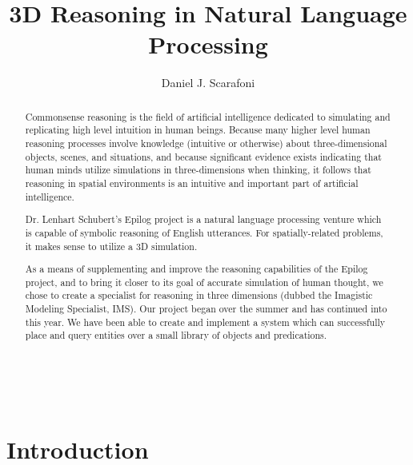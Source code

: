 \documentclass[11pt,leqno]{report}
\newcommand\TDS[0]{IMS\xspace}
\begin{document}
\sloppy
\title{3D Reasoning in Natural Language Processing}
\author{Daniel J. Scarafoni}
\maketitle


\thispagestyle{empty}
\newenvironment{dedication}
{\cleardoublepage \thispagestyle{empty} \vspace*{\stretch{1}}
  \begin{center} \em}
  {\end{center} \vspace*{\stretch{3}} }


\begin{abstract}
	Commonsense reasoning is the field of artificial intelligence dedicated to simulating and replicating high level intuition in human beings. 
	Because many higher level human reasoning processes involve knowledge (intuitive or otherwise) about three-dimensional objects, scenes, and situations, and because significant evidence exists indicating that human minds utilize simulations in three-dimensions when thinking, it follows that reasoning in spatial environments is an intuitive and important part of artificial intelligence.
	
	Dr. Lenhart Schubert's Epilog project is a natural language processing venture which is capable of symbolic reasoning of English utterances.
	For spatially-related problems, it makes sense to utilize a 3D simulation.
	
	As a means of supplementing and improve the reasoning capabilities of the Epilog project, and to bring it closer to its goal of accurate simulation of human thought, we chose to create a specialist for reasoning in three dimensions (dubbed the Imagistic Modeling Specialist, \TDS).
	Our project began over the summer and has continued into this year. 
	We have been able to create and implement a system which can successfully place and query entities over a small library of objects and predications.
\end{abstract}

\tableofcontents
\pagebreak\

\chapter{Introduction}

\end{document}
